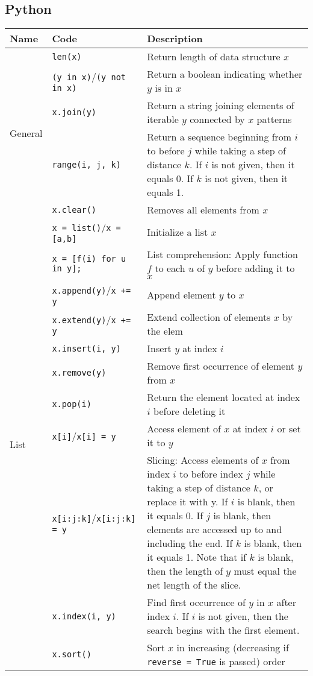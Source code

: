 \documentclass{article}
\begin{document}
\subsection{Python}
\begin{center}\begin{tabularx}{\textwidth}{llX}\toprule
Name & Code & Description\\\midrule

\multirow{5}{*}[-0.5em]{General} & \lstinline|len(x)| & Return length of data structure \(x\)\\
& \lstinline|(y in x)|/\lstinline|(y not in x)| & Return a boolean indicating whether \(y\) is in \(x\)\\
& \lstinline|x.join(y)| & Return a string joining elements of iterable \(y\) connected by \(x\) patterns\\
& \lstinline|range(i, j, k)| & Return a sequence beginning from \(i\) to before \(j\) while taking a step of distance \(k\). If \(i\) is not given, then it equals 0. If \(k\) is not given, then it equals 1.\\
& \lstinline|x.clear()| & Removes all elements from \(x\)\\\midrule

\multirow{11}{*}[-2.0em]{List} & \lstinline|x = list()|/\lstinline|x = [a,b]| & Initialize a list \(x\)\\
& \lstinline|x = [f(i) for u in y];| & List comprehension: Apply function \(f\) to each \(u\) of \(y\) before adding it to \(x\)\\
& \lstinline|x.append(y)|/\lstinline|x += y| & Append element \(y\) to \(x\)\\
& \lstinline|x.extend(y)|/\lstinline|x += y| & Extend collection of elements \(x\) by the elem\\
& \lstinline|x.insert(i, y)| & Insert \(y\) at index \(i\)\\
& \lstinline|x.remove(y)| & Remove first occurrence of element \(y\) from \(x\)\\
& \lstinline|x.pop(i)| & Return the element located at index \(i\) before deleting it\\
& \lstinline|x[i]|/\lstinline|x[i] = y| & Access element of \(x\) at index \(i\) or set it to \(y\)\\
& \lstinline|x[i:j:k]|/\lstinline|x[i:j:k] = y| & Slicing: Access elements of \(x\) from index \(i\) to before index \(j\) while taking a step of distance \(k\), or replace it with y. If \(i\) is blank, then it equals 0. If \(j\) is blank, then elements are accessed up to and including the end. If \(k\) is blank, then it equals 1. Note that if \(k\) is blank, then the length of \(y\) must equal the net length of the slice.\\
& \lstinline|x.index(i, y)| & Find first occurrence of \(y\) in \(x\) after index \(i\). If \(i\) is not given, then the search begins with the first element.\\
& \lstinline|x.sort()| & Sort \(x\) in increasing (decreasing if \lstinline|reverse = True| is passed) order\\\midrule


\end{tabularx}
\end{center}
\end{document}
